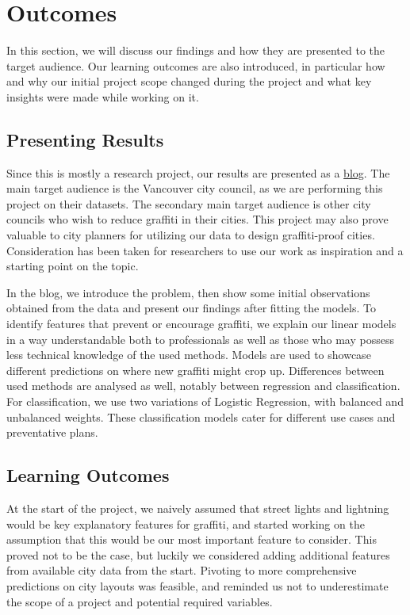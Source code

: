 \chapter{Outcomes}
In this section, we will discuss our findings and how they are presented to the target audience. Our learning outcomes are also introduced, in particular how and why our initial project scope changed during the project and what key insights were made while working on it.

\section{Presenting Results}

Since this is mostly a research project, our results are presented as a \href{https://cowkeyman.github.io/PredictingGraffitiUsingCityLayouts/}{blog}. The main target audience is the Vancouver city council, as we are performing this project on their datasets. The secondary main target audience is other city councils who wish to reduce graffiti in their cities. This project may also prove valuable to city planners for utilizing our data to design graffiti-proof cities. Consideration has been taken for researchers to use our work as inspiration and a starting point on the topic.

In the blog, we introduce the problem, then show some initial observations obtained from the data and present our findings after fitting the models. To identify features that prevent or encourage graffiti, we explain our linear models in a way understandable both to professionals as well as those who may possess less technical knowledge of the used methods. Models are used to showcase different predictions on where new graffiti might crop up. Differences between used methods are analysed as well, notably between regression and classification. For classification, we use two variations of Logistic Regression, with balanced and unbalanced weights. These classification models cater for different use cases and preventative plans.

\section{Learning Outcomes} %
At the start of the project, we naively assumed that street lights and lightning would be key explanatory features for graffiti, and started working on the assumption that this would be our most important feature to consider. This proved not to be the case, but luckily we considered adding additional features from available city data from the start. Pivoting to more comprehensive predictions on city layouts was feasible, and reminded us not to underestimate the scope of a project and potential required variables.

